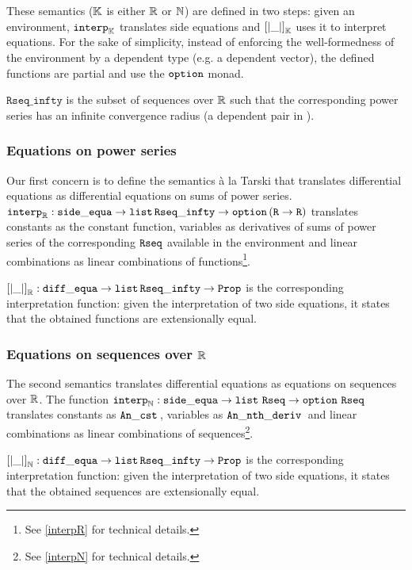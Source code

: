 \documentclass{article}
\begin{document}
These semantics ($\mathbb{K}$ is either $\mathbb{R}$ or $\mathbb{N}$) are defined in two steps:
given an environment, $\operatorname{\operatorname{\mathtt{interp}}_{\mathbb{K}}}$ translates side equations and
$\left[\left| \_ \right|\right]_{\mathbb{K}}$ uses it to interpret equations. For the
sake of simplicity, instead of enforcing the well-formedness of the environment
by a dependent type (e.g. a dependent vector), the defined functions are partial
and use the $\operatorname{\mathtt{option}}$ monad.

$\mathtt{Rseq\_infty}$ is the subset of sequences over $\mathbb{R}$ such that the
corresponding power series has an infinite convergence radius (a dependent
pair in \coq{}).

\subsubsection{Equations on power series}

Our first concern is to define the semantics \`a la Tarski that translates
differential equations as differential equations on sums of power series.
$\operatorname{\operatorname{\mathtt{interp}}_{\mathbb{R}}} : \operatorname{\mathtt{side\_equa}} \rightarrow \operatorname{\mathtt{list}}{} \mathtt{Rseq\_infty} \rightarrow \operatorname{\mathtt{option}}{}
(\texttt{R} \rightarrow \texttt{R})$ translates constants as the constant function,
variables as derivatives of sums of power series of the corresponding $\operatorname{\mathtt{Rseq}}$
available in the environment and linear combinations as linear combinations of
functions\footnote{See \ref{interpR} for technical details.}.

$\left[\left| \_ \right|\right]_{\mathbb{R}} : \operatorname{\mathtt{diff\_equa}} \rightarrow \operatorname{\mathtt{list}}{}
\mathtt{Rseq\_infty} \rightarrow \texttt{Prop}$ is the corresponding interpretation
function: given the interpretation of two side equations, it states that the
obtained functions are extensionally equal.

\subsubsection{Equations on sequences over $\mathbb{R}$}

The second semantics translates differential equations as equations on
sequences over $\mathbb{R}$.  The function $\operatorname{\operatorname{\mathtt{interp}}_{\mathbb{N}}} :
\operatorname{\mathtt{side\_equa}} \rightarrow \operatorname{\mathtt{list}}{} \operatorname{\mathtt{Rseq}} \rightarrow \operatorname{\mathtt{option}}{} \operatorname{\mathtt{Rseq}}$ translates
constants as $\operatorname{\mathtt{An\_cst}}{}$, variables as $\operatorname{\mathtt{An\_nth\_deriv}}{}$ and linear combinations as linear
combinations of sequences\footnote{See \ref{interpN} for technical details.}.

$\left[\left| \_ \right|\right]_{\mathbb{N}} : \operatorname{\mathtt{diff\_equa}} \rightarrow \operatorname{\mathtt{list}}{}
\mathtt{Rseq\_infty} \rightarrow \texttt{Prop}$ is the corresponding interpretation
function:  given the interpretation of two side equations, it states that the
obtained sequences are extensionally equal.
\end{document}
